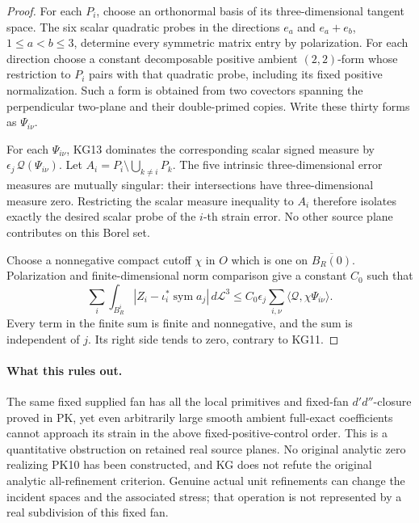 \begin{proof}
For each \(P_i\), choose an orthonormal basis of its
three-dimensional tangent space.  The six scalar quadratic
probes in the directions \(e_a\) and \(e_a+e_b\),
\(1\leq a<b\leq3\), determine every symmetric matrix
entry by polarization.  For each direction choose a constant
decomposable positive ambient \((2,2)\)-form whose restriction
to \(P_i\) pairs with that quadratic probe, including its
fixed positive normalization.  Such a form is obtained from
two covectors spanning the perpendicular two-plane and their
double-primed copies.  Write these thirty forms as
\(\Psi_{i\nu}\).

For each \(\Psi_{i\nu}\), KG13 dominates the corresponding
scalar signed measure by
\(\epsilon_j\,\mathcal Q(\Psi_{i\nu})\).
Let
\(A_i=P_i\setminus\bigcup_{k\ne i}P_k\).
The five intrinsic three-dimensional error measures are
mutually singular: their intersections have three-dimensional
measure zero.  Restricting the scalar measure inequality to
\(A_i\) therefore isolates exactly the desired scalar
probe of the \(i\)-th strain error.  No other source plane
contributes on this Borel set.

Choose a nonnegative compact cutoff \(\chi\) in \(O\)
which is one on \(\overline{B_R(0)}\).  Polarization and
finite-dimensional norm comparison give a constant \(C_0\)
such that
\[
 \sum_i\int_{B_R^i}
       |Z_i-\iota_i^*\operatorname{sym}a_j|\,d\mathcal L^3
 \leq C_0\epsilon_j
       \sum_{i,\nu}\langle\mathcal Q,\chi\Psi_{i\nu}\rangle.
 \tag{KG14}
\]
Every term in the finite sum is finite and nonnegative,
and the sum is independent of \(j\).  Its right side tends
to zero, contrary to KG11.
\end{proof}

\paragraph{What this rules out.}
The same fixed supplied fan has all the local primitives and
fixed-fan \(d'd''\)-closure proved in PK, yet even arbitrarily
large smooth ambient full-exact coefficients cannot approach
its strain in the above fixed-positive-control order.  This
is a quantitative obstruction on retained real source planes.
No original analytic zero realizing PK10 has been constructed,
and KG does not refute the original analytic all-refinement
criterion.  Genuine actual unit refinements can change the
incident spaces and the associated stress; that operation is
not represented by a real subdivision of this fixed fan.

